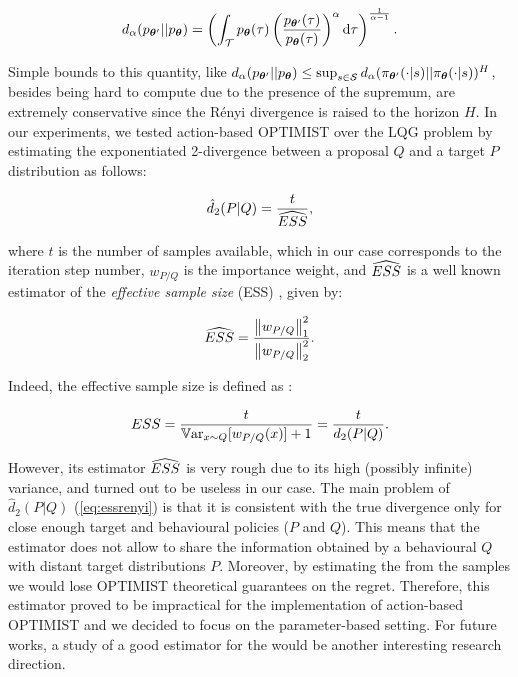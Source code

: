 \begin{align}
	d_{\alpha}(p_{\vtheta'}||p_{\vtheta}) = \left(\int_{\Tau}p_{\vtheta}(\tau)\left(\frac{p_{\vtheta'}(\tau)}{p_{\vtheta}(\tau)}\right)^{\alpha}\de \tau\right)^{\frac{1}{\alpha-1}}.
\end{align}

Simple bounds to this quantity, like $d_{\alpha}(p_{\vtheta'}||p_{\vtheta})\leq\sup_{s\in\Sspace}d_{\alpha}(\pi_{\vtheta'}(\cdot|s)||\pi_{\vtheta}(\cdot|s))^H$, besides being hard to compute due to the presence of the supremum, are extremely conservative since the Rényi divergence is raised to the horizon $H$. In our experiments, we tested action-based \gls{OPTIMIST} over the \gls{LQG} problem by estimating the exponentiated 2-\Renyi divergence between a proposal $Q$ and a target $P$ distribution as follows:

\begin{align} \label{eq:essrenyi}
\hat{d}_{2}(P|Q)=\frac{t}{\wh{ESS}},
\end{align}

where $t$ is the number of samples available, which in our case corresponds to the iteration step number, $w_{P/Q}$ is the importance weight, and $\wh{ESS}$ \cite{martino2017effective} is a well known estimator of the \emph{effective sample size} (ESS) \cite{kong1992note}, given by:

\begin{align}
\wh{ESS} = \frac{\norm[1]{w_{P/Q}}^2}{\norm[2]{w_{P/Q}}^2}.
\end{align}

Indeed, the effective sample size is defined as \cite{kong1992note}:

\begin{align}
ESS = \frac{t}{\Var_{x\sim Q}[w_{P/Q}(x)]+1}=\frac{t}{d_{2}(P|Q)}.
\end{align}

However, its estimator $\wh{ESS}$ is very rough due to its high (possibly infinite) variance, and turned out to be useless in our case. The main problem of $\hat{d}_{2}(P|Q)$ (\ref{eq:essrenyi}) is that it is consistent with the true \Renyi divergence only for close enough target and behavioural policies ($P$ and $Q$). This means that the estimator does not allow to share the information obtained by a behavioural $Q$ with distant target distributions $P$. Moreover, by estimating the \Renyi from the samples we would lose \gls{OPTIMIST} theoretical guarantees on the regret. Therefore, this estimator proved to be impractical for the implementation of action-based \gls{OPTIMIST} and we decided to focus on the parameter-based setting. For future works, a study of a good estimator for the \Renyi would be another interesting research direction.